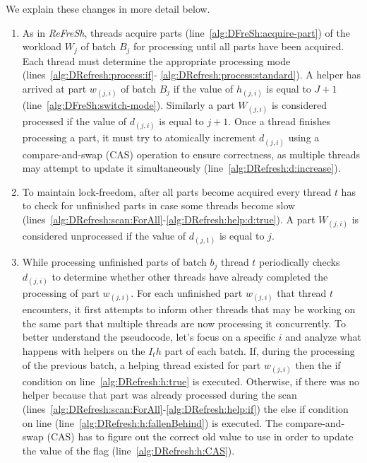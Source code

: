    We explain these changes in more detail below.

    \begin{enumerate}
        \item As in \textit{ReFreSh}, threads acquire parts (line~\ref{alg:DFreSh:acquire-part}) of the
        workload $W_j$ of batch $B_j$ for processing until all parts have been acquired. Each thread
        must determine the appropriate processing mode (lines~\ref{alg:DRefresh:process:if}-
        \ref{alg:DRefresh:process:standard}). A helper has arrived at part $w_(j,i)$ of
        batch $B_j$ if the value of $h_(j,i)$ is equal to $J + 1$ (line~\ref{alg:DFreSh:switch-mode}).
        Similarly a part $W_(j,i)$ is considered processed if the value of $d_(j,i)$ is equal to $j+1$.
        Once a thread finishes processing a part, it must try to atomically increment $d_(j,i)$ using a
        compare-and-swap (CAS) operation to ensure correctness, as multiple threads may attempt
        to update it simultaneously (line~\ref{alg:DRefresh:d:increase}).
    
        \item To maintain lock-freedom, after all parts become acquired every thread $t$ 
        has to check for unfinished parts in case some threads become slow
        (lines~\ref{alg:DRefresh:scan:ForAll}-\ref{alg:DRefresh:help:d:true}). A part 
        $W_(j,i)$ is considered unprocessed if the value of $d_(j,1)$ is equal to $j$.
          
        \item While processing unfinished parts of batch $b_j$ thread $t$ periodically checks $d_(j,i)$  
        to determine whether other threads have already completed the processing of part $w_(j,i)$.
        For each unfinished part $w_(j,i)$ that thread $t$ encounters, it first attempts to inform other
        threads that may be working on the same part that multiple threads are now processing it
        concurrently. To better understand the pseudocode, let's focus on a specific $i$ and analyze
        what happens with helpers on the $I_th$ part of each batch. If, during the processing of the
        previous batch, a helping thread existed for part $w_(j,i)$ then the if condition
        on line~\ref{alg:DRefresh:h:true} is executed. Otherwise, if there was no helper because that
        part was already processed during the scan (lines~\ref{alg:DRefresh:scan:ForAll}-\ref{alg:DRefresh:help:if})
        the else if condition on line (line~\ref{alg:DRefresh:h:fallenBehind}) is executed. 
        The compare-and-swap (CAS) has to figure out the correct old value to use in order to update
        the value of the flag (line~\ref{alg:DRefresh:h:CAS}).
    \end{enumerate}
